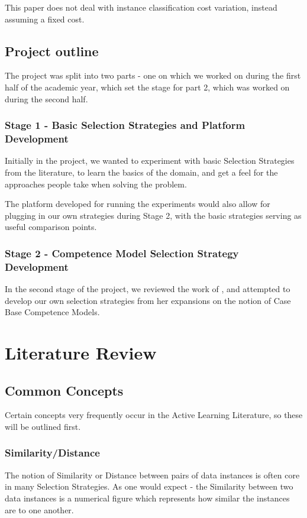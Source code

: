 \documentclass[a4paper,11pt]{report}
\begin{document}
This paper does not deal with instance classification cost variation, instead assuming a fixed cost.

\section{Project outline}
The project was split into two parts - one on which we worked on during the first half of the academic year, which set the stage for part 2, which was worked on during the second half.

\subsection{Stage 1 - Basic Selection Strategies and Platform Development}
Initially in the project, we wanted to experiment with basic Selection Strategies from the literature, to learn the basics of the domain, and get a feel for the approaches people take when solving the problem.

The platform developed for running the experiments would also allow for plugging in our own strategies during Stage 2, with the basic strategies serving as useful comparison points.

\subsection{Stage 2 - Competence Model Selection Strategy Development}
In the second stage of the project, we reviewed the work of \cite{Delany2009}, and attempted to develop our own selection strategies from her expansions on the notion of Case Base Competence Models.

\chapter{Literature Review}

\section{Common Concepts}
Certain concepts very frequently occur in the Active Learning Literature, so these will be outlined first.

\subsection{Similarity/Distance}
The notion of Similarity or Distance between pairs of data instances is often core in many Selection Strategies. As one would expect - the Similarity between two data instances is a numerical figure which represents how similar the instances are to one another.
\end{document}
